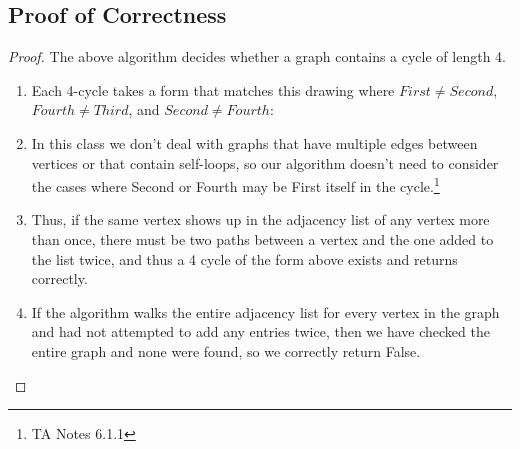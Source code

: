 \documentclass{article}
\begin{document}
\subsection{Proof of Correctness}
\begin{proof} The above algorithm decides whether a graph contains a cycle of length 4.
      \begin{enumerate}
            \item Each 4-cycle takes a form that matches this drawing where \(First \neq Second\),
                  \(Fourth \neq Third\), and
                  \(Second \neq Fourth\):
            \item In this class we don't deal with graphs that have multiple edges between
                  vertices or that contain self-loops, so our algorithm doesn't need to
                  consider the cases where Second or Fourth may be First itself in the
                  cycle.\footnote{TA Notes 6.1.1}
            \item Thus, if the same vertex shows up in the adjacency list of any vertex
                  more than once, there must be two paths between a vertex and the one added to
                  the list twice, and thus a 4 cycle of the form above exists and returns
                  correctly.
            \item If the algorithm walks the entire adjacency list for every vertex
                  in the graph and had not attempted to add any entries twice, then we
                  have checked the entire graph and none were found, so we correctly
                  return False.
      \end{enumerate}
\end{proof}
\end{document}
